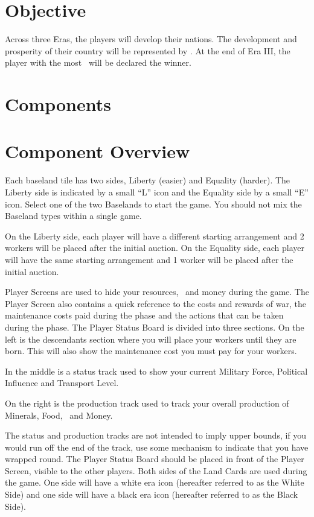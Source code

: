 \documentclass[10pt,twocolumn]{article}
\begin{document}
\section{Objective}
Across three Eras, the players will develop their nations. The development and prosperity of their country will be represented by \victorypoints. At the end of Era III, the player with the most \victorypoints\ will be declared the winner.
\section{Components}
\section{Component Overview}
Each baseland tile has two sides, Liberty (easier) and Equality (harder). The Liberty side is indicated by a small ``L'' icon and the Equality side by a small ``E'' icon. Select one of the two Baselands to start the game. You should not mix the Baseland types within a single game.

On the Liberty side, each player will have a different starting arrangement and 2 workers will be placed after the initial auction. On the Equality side, each player will have the same starting arrangement and 1 worker will be placed after the initial auction.

Player Screens are used to hide your resources, \vps\ and money during the game. The Player Screen also contains a quick reference to the costs and rewards of war, the maintenance costs paid during the  phase and the actions that can be taken during the  phase.
The Player Status Board is divided into three sections. On the left is the descendants section where you will place your workers until they are born. This will also show the maintenance cost you must pay for your workers.

In the middle is a status track used to show your current Military Force, Political Influence and Transport Level.

On the right is the production track used to track your overall production of Minerals, Food, \vps\ and Money.

The status and production tracks are not intended to imply upper bounds, if you would run off the end of the track, use some mechanism to indicate that you have wrapped round. The Player Status Board should be placed in front of the Player Screen, visible to the other players.
Both sides of the Land Cards are used during the game. One side will have a white era icon (hereafter referred to as the White Side) and one side will have a black era icon (hereafter referred to as the Black Side).
\end{document}
